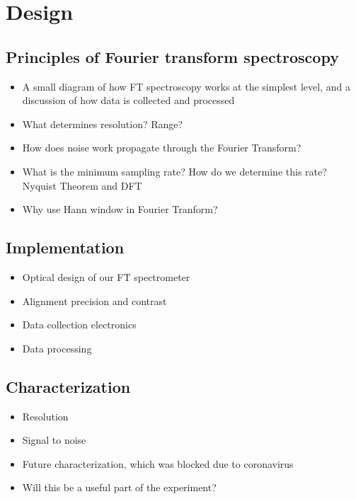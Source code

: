 \documentclass[12pt]{puthesis}
\begin{document}
  
\section{Design}

\subsection{Principles of Fourier transform spectroscopy}
\begin{itemize}
\item A small diagram of how FT spectroscopy works at the simplest level, and a discussion of how data is collected and processed

\item What determines resolution? Range?

\item How does noise work propagate through the Fourier Transform?

\item What is the minimum sampling rate? How do we determine this rate? Nyquist Theorem and DFT 

\item Why use Hann window in Fourier Tranform?
\end{itemize}

\subsection{Implementation}
\begin{itemize}
\item Optical design of our FT spectrometer 

\item Alignment precision and contrast

\item Data collection electronics 

\item Data processing 
\end{itemize}

\subsection{Characterization}
\begin{itemize}
\item Resolution

\item Signal to noise 

\item Future characterization, which was blocked due to coronavirus 

\item Will this be a useful part of the experiment?
\end{itemize}
\end{document}
